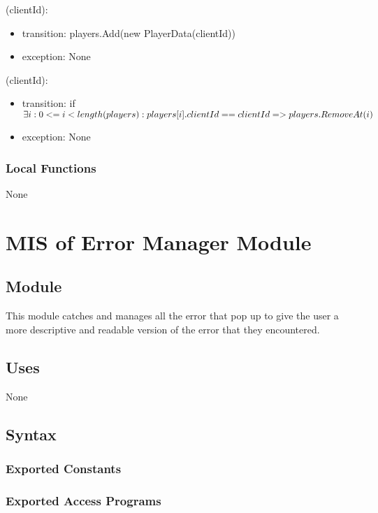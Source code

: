 \documentclass[12pt, titlepage]{article}
\begin{document}
(clientId):
\begin{itemize}
\item transition: players.Add(new PlayerData(clientId))
\item exception: None
\end{itemize}

(clientId):
\begin{itemize}
\item transition: if $  \exists i: 0 <= i < length(players) : \newline players[i].clientId == clientId => players.RemoveAt(i) $
\item exception: None
\end{itemize}

\subsubsection{Local Functions}

None

\newpage


\section{MIS of {Error Manager Module}} \label{ErrorModule} 

\subsection{Module}

This module catches and manages all the error that pop up to give the user a more descriptive and readable version of the error that they encountered.

\subsection{Uses}

None

\subsection{Syntax}

\subsubsection{Exported Constants}

\subsubsection{Exported Access Programs}
\end{document}

